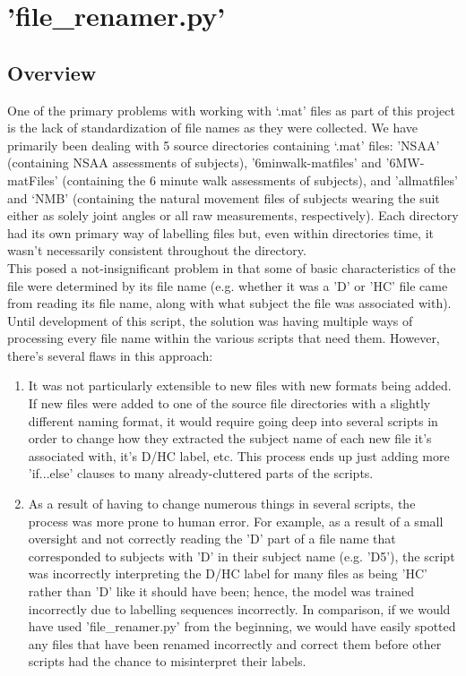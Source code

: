 \documentclass[12pt,twoside]{report}
\begin{document}
\section{'file\_renamer.py'}

\subsection{Overview}

\quad One of the primary problems with working with ‘.mat’ files as part of this project is the lack of standardization of file names as they were collected. We have primarily been dealing with 5 source directories containing ‘.mat’ files: 'NSAA' (containing NSAA assessments of subjects), '6minwalk-matfiles' and '6MW-matFiles' (containing the 6 minute walk assessments of subjects), and 'allmatfiles' and ‘NMB’ (containing the natural movement files of subjects wearing the suit either as solely joint angles or all raw measurements, respectively). Each directory had its own primary way of labelling files but, even within directories time, it wasn't necessarily consistent throughout the directory.\\

\quad This posed a not-insignificant problem in that some of basic characteristics of the file were determined by its file name (e.g. whether it was a 'D' or 'HC' file came from reading its file name, along with what subject the file was associated with). Until development of this script, the solution was having multiple ways of processing every file name within the various scripts that need them. However, there's several flaws in this approach:\\

\begin{enumerate}
	\item It was not particularly extensible to new files with new formats being added. If new files were added to one of the source file directories with a slightly different naming format, it would require going deep into several scripts in order to change how they extracted the subject name of each new file it’s associated with, it's D/HC label, etc. This process ends up just adding more 'if...else' clauses to many already-cluttered parts of the scripts.
	\item As a result of having to change numerous things in several scripts, the process was more prone to human error. For example, as a result of a small oversight and not correctly reading the 'D' part of a file name that corresponded to subjects with 'D' in their subject name (e.g. 'D5'), the script was incorrectly interpreting the D/HC label for many files as being 'HC' rather than 'D' like it should have been; hence, the model was trained incorrectly due to labelling sequences incorrectly. In comparison, if we would have used 'file\_renamer.py' from the beginning, we would have easily spotted any files that have been renamed incorrectly and correct them before other scripts had the chance to misinterpret their labels.
\end{enumerate}
\end{document}
